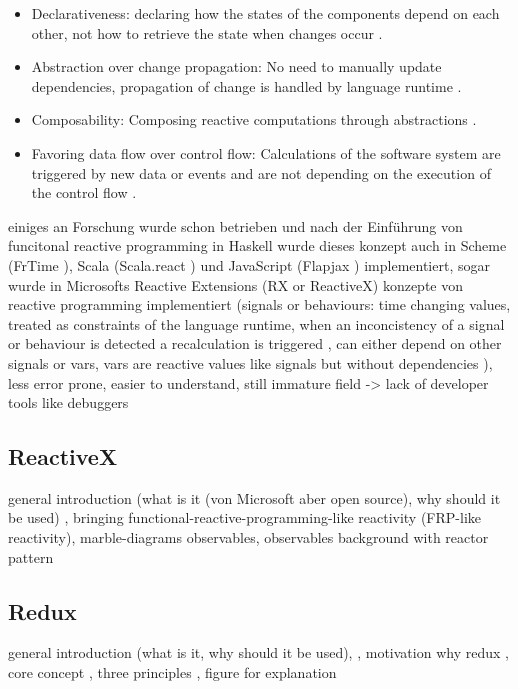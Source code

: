 \documentclass[Bachelor,BIF,english]{twbook}
\begin{document}
\begin{itemize}
\item Declarativeness: declaring how the states of the components depend on each other, not how to retrieve the state when changes occur \cite[p.~2]{PositivEffectOfRP}.
\item Abstraction over change propagation: No need to manually update dependencies, propagation of change is handled by language runtime \cite[p.~2]{PositivEffectOfRP}.
\item Composability: Composing reactive computations through abstractions \cite[p.~2]{PositivEffectOfRP}.
\item Favoring data flow over control flow: Calculations of the software system are triggered by new data or events and are not depending on the execution of the control flow \cite[p.~2]{PositivEffectOfRP}.
\end{itemize}
einiges an Forschung wurde schon betrieben und nach der Einführung von funcitonal reactive programming in Haskell wurde dieses konzept auch in Scheme (FrTime \cite{FrTime}), Scala (Scala.react \cite{DeprecatingOP}) und JavaScript (Flapjax \cite{Flapjax}) implementiert, sogar wurde in Microsofts Reactive Extensions (RX or ReactiveX) konzepte von reactive programming implementiert \cite[p.~954]{RPWalkthrough} \cite[p.~796]{DebuggingRP} \cite[p.~2]{PositivEffectOfRP}
(signals or behaviours: time changing values, treated as constraints of the language runtime, when an inconcistency of a signal or behaviour is detected a recalculation is triggered \cite[p.~797]{DebuggingRP} \cite[p.~3]{PositivEffectOfRP}, can either depend on other signals or vars, vars are reactive values like signals but without dependencies \cite[p.~2]{PositivEffectOfRP}), less error prone, easier to understand, still immature field -> lack of developer tools like debuggers \cite[p.~796]{DebuggingRP}

\subsection{ReactiveX}
general introduction (what is it \cite{ReactiveExtensions} (von Microsoft aber open source), why should it be used) \cite{ReactiveX}, bringing functional-reactive-programming-like reactivity (FRP-like reactivity), marble-diagrams
observables, observables background with reactor pattern \cite{RxObservables}

\subsection{Redux}
general introduction (what is it, why should it be used), \cite{Redux}, motivation why redux \cite{ReduxIntroMoti}, core concept \cite{ReduxIntroCC}, three principles \cite{ReduxIntro3P}, figure for explanation
\end{document}
